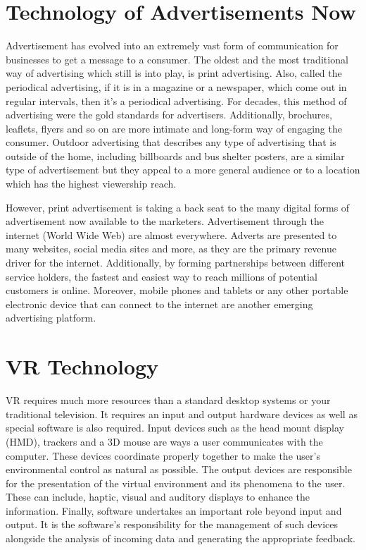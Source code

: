 \documentclass[11pt]{article} %
\begin{document}
\section{Technology of Advertisements Now}
Advertisement has evolved into an extremely vast form of communication for businesses to get a message to a consumer. The oldest and the most traditional way of advertising which still is into play, is print advertising. Also, called the periodical advertising, if it is in a magazine or a newspaper, which come out in regular intervals, then it’s a periodical advertising. For decades, this method of advertising were the gold standards for advertisers. Additionally, brochures, leaflets, flyers and so on are more intimate and long-form way of engaging the consumer. Outdoor advertising that describes any type of advertising that is outside of the home, including billboards and bus shelter posters, are a similar type of advertisement but they appeal to a more general audience or to a location which has the highest viewership reach. 
\par

However, print advertisement is taking a back seat to the many digital forms of advertisement now available to the marketers. Advertisement through the internet (World Wide Web) are almost everywhere. Adverts are presented to many websites, social media sites and more, as they are the primary revenue driver for the internet. Additionally, by forming partnerships between different service holders, the fastest and easiest way to reach millions of potential customers is online. Moreover, mobile phones and tablets or any other portable electronic device that can connect to the internet are another emerging advertising platform.
\par

\section{VR Technology}
VR requires much more resources than a standard desktop systems or your traditional television. It requires an input and output hardware devices as well as special software is also required. Input devices such as the head mount display (HMD), trackers and a 3D mouse are ways a user communicates with the computer. These devices coordinate properly together to make the user’s environmental control as natural as possible. The output devices are responsible for the presentation of the virtual environment and its phenomena to the user. These can include, haptic, visual and auditory displays to enhance the information. Finally, software undertakes an important role beyond input and output. It is the software’s responsibility for the management of such devices alongside the analysis of incoming data and generating the appropriate feedback.
\par
\end{document}
